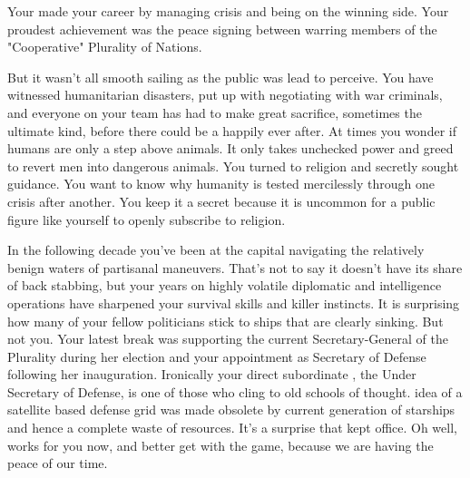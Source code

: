 \documentclass[char]{guildcamp3}
\begin{document}
\name{\cPoliOne{}}






Your made your career by managing crisis and being on the winning side. Your proudest achievement was the peace signing between warring members of the "Cooperative" Plurality of Nations.  

But it wasn't all smooth sailing as the public was lead to perceive. You have witnessed humanitarian disasters, put up with negotiating with war criminals, and everyone on your team has had to make great sacrifice, sometimes the ultimate kind, before there could be a happily ever after. At times you wonder if humans are only a step above animals. It only takes unchecked power and greed to revert men into dangerous animals. You turned to religion and secretly sought guidance. You want to know why humanity is tested mercilessly through one crisis after another. You keep it a secret because it is uncommon for a public figure like yourself to openly subscribe to religion. 

In the following decade you've been at the capital navigating the relatively benign waters of partisanal maneuvers. That's not to say it doesn't have its share of back stabbing, but your years on highly volatile diplomatic and intelligence operations have sharpened your survival skills and killer instincts. It is surprising how many of your fellow politicians stick to ships that are clearly sinking. But not you. Your latest break was supporting the current Secretary-General of the Plurality during her election and your appointment as Secretary of Defense following her inauguration. Ironically your direct subordinate \cPoliTwo{\intro}, the Under Secretary of Defense, is one of those who cling to old schools of thought. \cPoliTwo{\Their} idea of a satellite based defense grid was made obsolete by current generation of starships and hence a complete waste of resources. It's a surprise that \cPoliTwo{\they} kept \cPoliTwo{\their} office. Oh well, \cPoliTwo{\they} works for you now, and  better get with the game, because we are having the peace of our time.
\end{document}

